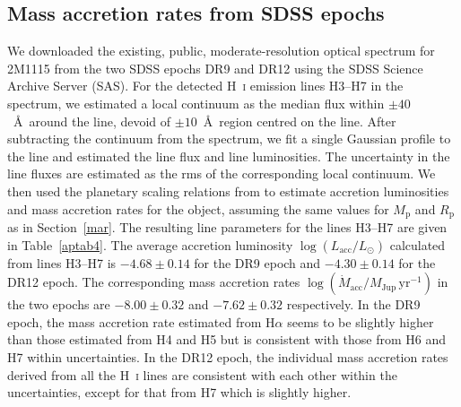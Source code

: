 \documentclass{aa}
\newcommand{\mjyr}{\ensuremath{M_\mathrm{Jup}\,\mathrm{yr^{-1}}}\xspace}
\newcommand{\lsun}{\ensuremath{L_\odot}\xspace}
\newcommand{\Mp}{\ensuremath{M_{\mathrm{p}}}\xspace}
\newcommand{\Rp}{\ensuremath{R_{\mathrm{p}}}\xspace}
\newcommand{\Ha}{\ensuremath{\mathrm{H}\alpha}\xspace}
\newcommand{\Lacc}{\ensuremath{L_{\mathrm{acc}}}\xspace}
\newcommand{\mdot}{\ensuremath{\dot{M}_{\mathrm{acc}}}\xspace}
\newcommand{\Hi}{H~\textsc{i}\xspace}
\begin{document}
\begin{appendix}
\section{Mass accretion rates from SDSS epochs} \label{sdss}
We downloaded the existing, public, moderate-resolution optical spectrum for 2M1115 from the two SDSS epochs DR9 \citep{sdss9} and DR12 \citep{sdss12} using the SDSS Science Archive Server (SAS). For the detected \Hi emission lines H3--H7 in the spectrum, we estimated a local continuum as the median flux within $\pm40$~\AA\ around the line, devoid of $\pm10$~\AA\ region centred on the line. After subtracting the continuum from the spectrum, we fit a single Gaussian profile to the line and estimated the line flux and line luminosities. The uncertainty in the line fluxes are estimated as the rms of the corresponding local continuum. We then used the planetary scaling relations from \cite{aoyama2021} to estimate accretion luminosities and mass accretion rates for the object, assuming the same values for \Mp and \Rp as in Section~\ref{mar}. The resulting line parameters for the lines H3--H7 are given in Table~\ref{aptab4}. The average accretion luminosity $\log(\Lacc/\lsun)$ calculated from lines H3--H7 is $-4.68\pm0.14$ for the DR9 epoch and $-4.30\pm0.14$ for the DR12 epoch. The corresponding mass accretion rates $\log(\mdot/\mjyr)$ in the two epochs are $-8.00\pm0.32$ and $-7.62\pm0.32$ respectively. In the DR9 epoch, the mass accretion rate estimated from \Ha seems to be slightly higher than those estimated from H4 and H5 but is consistent with those from H6 and H7 within uncertainties. In the DR12 epoch, the individual mass accretion rates derived from all the \Hi lines are consistent with each other within the uncertainties, except for that from H7 which is slightly higher. 


\end{appendix}
\end{document}
